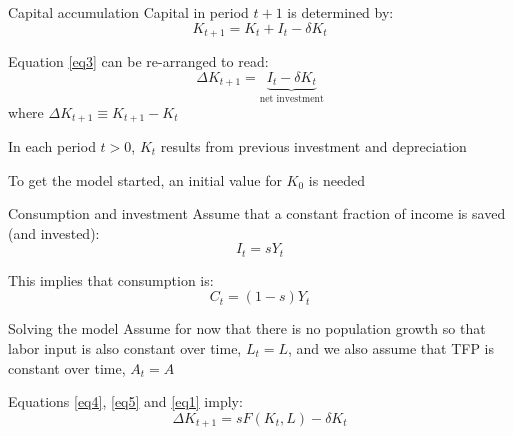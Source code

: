 \documentclass[10pt,handout]{beamer}
\begin{document}
\begin{frame}{Capital accumulation}
    Capital in period $t+1$ is determined by:
    \begin{equation} \label{eq3}
        K_{t+1}=K_t+I_t-\delta K_t
    \end{equation} \smallskip

    Equation \eqref{eq3} can be re-arranged to read:
    \begin{equation} \label{eq4}
        \Delta K_{t+1}= \underbrace{I_t - \delta K_t}_{\text{net investment}}
    \end{equation}
    where $\Delta K_{t+1} \equiv K_{t+1}-K_t$\medskip

    In each period $t>0$, $K_t$ results from previous investment and depreciation\smallskip

    To get the model started, an initial value for $K_0$ is needed
\end{frame}


\begin{frame}{Consumption and investment}
    Assume that a constant fraction of income is saved (and invested):
    \begin{equation} \label{eq5}
        I_t=sY_t
    \end{equation}\smallskip

    This implies that consumption is:
    \begin{equation} \label{eq6}
        C_t=(1-s)Y_t
    \end{equation}
\end{frame}


\begin{frame}{Solving the model}
    Assume for now that there is no population growth so that labor input is also constant over time, $L_t=L$, and we also assume that TFP is constant over time, $A_t=A$  \bigskip

    Equations \eqref{eq4}, \eqref{eq5} and \eqref{eq1} imply:
    \begin{equation} \label{eq7}
        \Delta K_{t+1}= sF(K_t,L) - \delta K_t
    \end{equation}
\end{frame}
\end{document}
